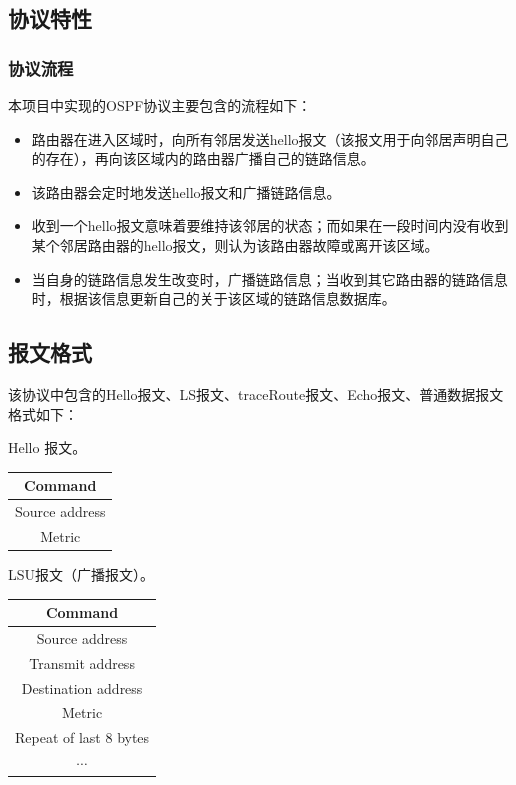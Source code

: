 \subsection{协议特性} %
\label{sub:协议特性}
\subsubsection{协议流程} %
\label{ssub:协议流程}
本项目中实现的OSPF协议主要包含的流程如下：
\begin{itemize}
	\item 路由器在进入区域时，向所有邻居发送hello报文（该报文用于向邻居声明自己的存在），再向该区域内的路由器广播自己的链路信息。
	\item 该路由器会定时地发送hello报文和广播链路信息。
	\item 收到一个hello报文意味着要维持该邻居的状态；而如果在一段时间内没有收到某个邻居路由器的hello报文，则认为该路由器故障或离开该区域。
	\item 当自身的链路信息发生改变时，广播链路信息；当收到其它路由器的链路信息时，根据该信息更新自己的关于该区域的链路信息数据库。
\end{itemize}		
\subsection{报文格式} %
\label{sub:报文格式}
该协议中包含的Hello报文、LS报文、traceRoute报文、Echo报文、普通数据报文格式如下：
\par Hello 报文。
\begin{table}[H]
	\centering
	\begin{tabular}{|c|}
		\hline         
		Command        \\
		\hline         
		Source address \\
		\hline         
		Metric         \\
		\hline         
	\end{tabular}		
\end{table}
	
LSU报文（广播报文）。
\begin{table}[H]
	\centering
	\begin{tabular}{|c|}
		\hline                 
		Command                \\
		\hline                 
		Source address         \\
		\hline                 
		Transmit address       \\
		\hline                 
		Destination address    \\
		\hline                 
		Metric                 \\
		\hline                 
		Repeat of last 8 bytes \\
		\hline                 
		$\cdots$               \\
		\hline                 
	\end{tabular}		
\end{table}

